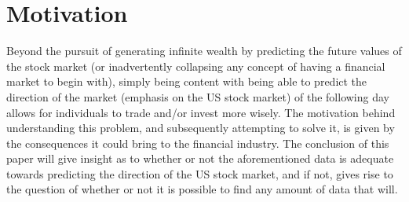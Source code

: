 \documentclass[11pt]{article}
\begin{document}
\newpage

\section{Motivation}
Beyond the pursuit of generating infinite wealth by predicting the future values of the stock market (or inadvertently collapsing any concept of having a financial market to begin with), simply being content with being able to predict the direction of the market (emphasis on the US stock market) of the following day allows for individuals to trade and/or invest more wisely. The motivation behind understanding this problem, and subsequently attempting to solve it, is given by the consequences it could bring to the financial industry. The conclusion of this paper will give insight as to whether or not the aforementioned data is adequate towards predicting the direction of the US stock market, and if not, gives rise to the question of whether or not it is possible to find any amount of data that will. 
\end{document}
